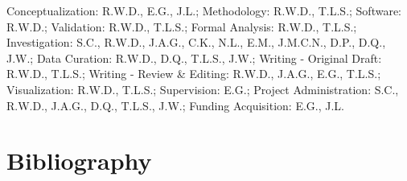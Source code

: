 \documentclass{article}
\begin{document}
Conceptualization: R.W.D., E.G., J.L.; Methodology: R.W.D., T.L.S.;
Software: R.W.D.; Validation: R.W.D., T.L.S.; Formal Analysis: R.W.D.,
T.L.S.; Investigation: S.C., R.W.D., J.A.G., C.K., N.L., E.M., J.M.C.N.,
D.P., D.Q., J.W.; Data Curation: R.W.D., D.Q., T.L.S., J.W.; Writing -
Original Draft: R.W.D., T.L.S.; Writing - Review \& Editing: R.W.D.,
J.A.G., E.G., T.L.S.; Visualization: R.W.D., T.L.S.; Supervision: E.G.;
Project Administration: S.C., R.W.D., J.A.G., D.Q., T.L.S., J.W.;
Funding Acquisition: E.G., J.L.

\hypertarget{format}{%
\section*{Bibliography}\label{format}}
\end{document}
